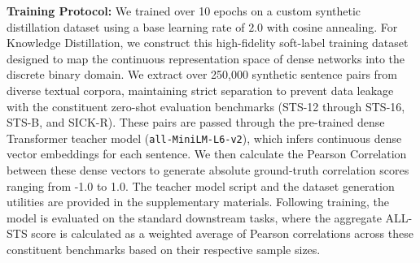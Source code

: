 \documentclass{article} %
\begin{document}
\textbf{Training Protocol:} We trained over 10 epochs on a custom synthetic distillation dataset using a base learning rate of $2.0$ with cosine annealing. For Knowledge Distillation, we construct this high-fidelity soft-label training dataset designed to map the continuous representation space of dense networks into the discrete binary domain. We extract over 250,000 synthetic sentence pairs from diverse textual corpora, maintaining strict separation to prevent data leakage with the constituent zero-shot evaluation benchmarks (STS-12 through STS-16, STS-B, and SICK-R). These pairs are passed through the pre-trained dense Transformer teacher model (\texttt{all-MiniLM-L6-v2}), which infers continuous dense vector embeddings for each sentence. We then calculate the Pearson Correlation between these dense vectors to generate absolute ground-truth correlation scores ranging from -1.0 to 1.0. The teacher model script and the dataset generation utilities are provided in the supplementary materials. Following training, the model is evaluated on the standard downstream tasks, where the aggregate ALL-STS score is calculated as a weighted average of Pearson correlations across these constituent benchmarks based on their respective sample sizes.

\begin{table}[ht]
\centering
\caption{Comprehensive Evaluation: Dimensionality Scaling and Architectural Ablation}
\end{table}
\end{document}
